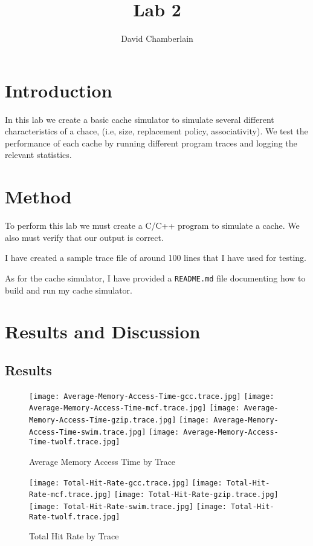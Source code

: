 \documentclass[12pt]{article}
\begin{document}
\title{Lab 2}
\author{David Chamberlain}
\date{}
\maketitle
\section{Introduction}
In this lab we create a basic cache simulator to simulate several different characteristics of a chace, (i.e, size, replacement policy, associativity). We test the performance of each cache by running different program traces and logging the relevant statistics.

\section{Method}
To perform this lab we must create a C/C++ program to simulate a cache. We also must verify that our output is correct.

I have created a sample trace file of around 100 lines that I have used for testing.

As for the cache simulator, I have provided a \verb|README.md| file documenting how to build and run my cache simulator.

\section{Results and Discussion}
\subsection{Results}

\begin{figure}[H]
  \centering
  \texttt{[image: Average-Memory-Access-Time-gcc.trace.jpg]}
  \texttt{[image: Average-Memory-Access-Time-mcf.trace.jpg]}
  \hfil
  \texttt{[image: Average-Memory-Access-Time-gzip.trace.jpg]}
  \texttt{[image: Average-Memory-Access-Time-swim.trace.jpg]}
  \hfil
  \texttt{[image: Average-Memory-Access-Time-twolf.trace.jpg]}
  \caption{Average Memory Access Time by Trace}
\end{figure}

\begin{figure}[H]
  \centering
  \texttt{[image: Total-Hit-Rate-gcc.trace.jpg]}
  \texttt{[image: Total-Hit-Rate-mcf.trace.jpg]}
  \hfil
  \texttt{[image: Total-Hit-Rate-gzip.trace.jpg]}
  \texttt{[image: Total-Hit-Rate-swim.trace.jpg]}
  \hfil
  \texttt{[image: Total-Hit-Rate-twolf.trace.jpg]}
  \caption{Total Hit Rate by Trace}
\end{figure}
\end{document}
